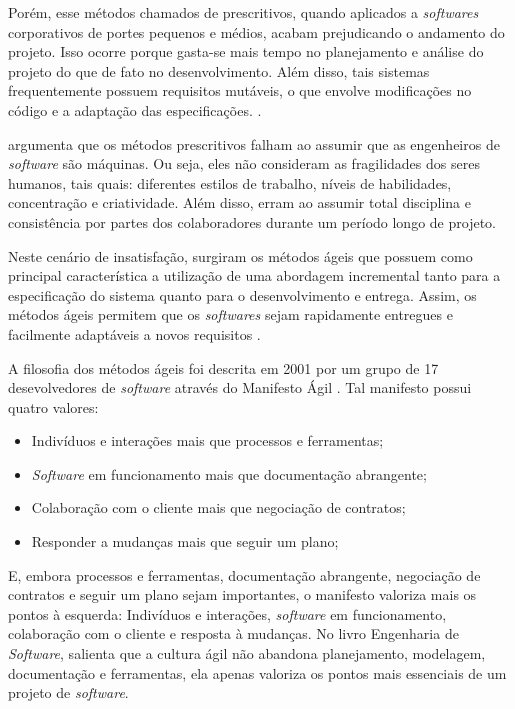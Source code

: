 \documentclass[
    12pt,       %
    openright,      %
    twoside,      %
    a4paper,      %
    english,      %
    french,       %
    spanish,      %
    brazil,       %
    ]{abntex2}
\begin{document}
Porém, esse métodos chamados de prescritivos, quando aplicados a \textit{softwares} corporativos de portes pequenos e médios, acabam prejudicando o andamento do projeto. Isso ocorre porque gasta-se mais tempo no planejamento e análise do projeto do que de fato no desenvolvimento. Além disso, tais sistemas frequentemente possuem requisitos mutáveis, o que envolve modificações no código e a adaptação das especificações. \cite{SOMMERVILLE:2011}.

 argumenta que os métodos prescritivos falham ao assumir que as engenheiros de \textit{software} são máquinas. Ou seja, eles não consideram as fragilidades dos seres humanos, tais quais: diferentes estilos de trabalho, níveis de habilidades, concentração e criatividade. Além disso, erram ao assumir total disciplina e consistência por partes dos colaboradores durante um período longo de projeto.

Neste cenário de insatisfação, surgiram os métodos ágeis que possuem como principal característica a utilização de uma abordagem incremental tanto para a especificação do sistema quanto para o desenvolvimento e entrega. Assim, os métodos ágeis permitem que os \textit{softwares} sejam rapidamente entregues e facilmente adaptáveis a novos requisitos \cite{SOMMERVILLE:2011}.

A filosofia dos métodos ágeis foi descrita em 2001 por um grupo de 17 desevolvedores de \textit{software} através do Manifesto Ágil \cite{AGILEMANIFEST:2001}. Tal manifesto possui quatro valores:

\begin{itemize}
        \item Indivíduos e interações mais que processos e ferramentas;
        \item \textit{Software} em funcionamento mais que documentação abrangente;
        \item Colaboração com o cliente mais que negociação de contratos;
        \item Responder a mudanças mais que seguir um plano;
\end{itemize}

E, embora processos e ferramentas, documentação abrangente, negociação de contratos e seguir um plano sejam importantes, o manifesto valoriza mais os pontos à esquerda: Indivíduos e interações, \textit{software} em funcionamento, colaboração com o cliente e resposta à mudanças. No livro Engenharia de \textit{Software},  salienta que a cultura ágil não abandona planejamento, modelagem, documentação e ferramentas, ela apenas valoriza os pontos mais essenciais de um projeto de \textit{software}.
\end{document}
